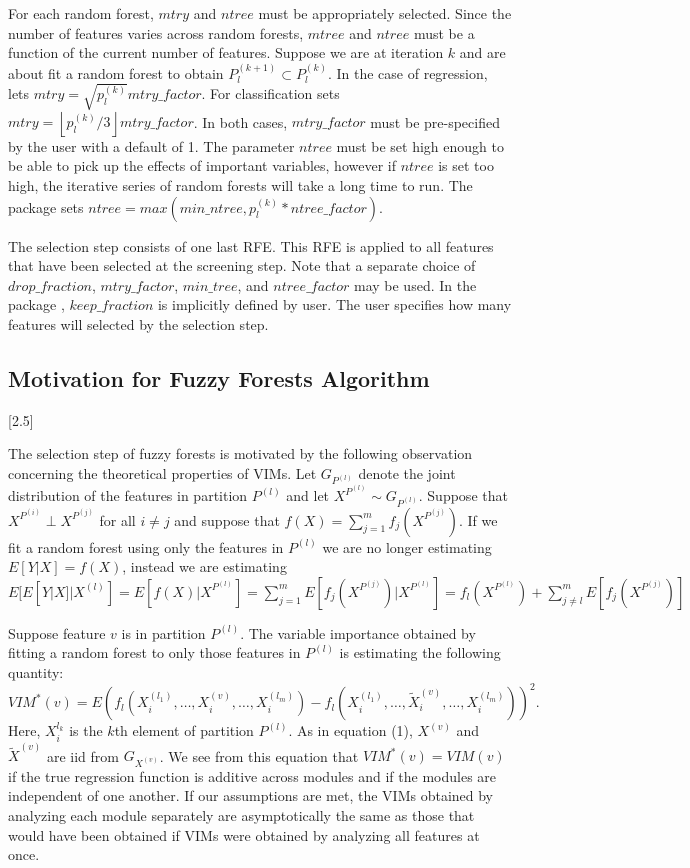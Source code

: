 \documentclass[article,shortnames]{jss}
\begin{document}
For each random forest, $mtry$ and $ntree$ must be appropriately selected.  Since the number of features varies across random forests, $mtree$
and $ntree$ must be a function of the current number of features.   Suppose we are at iteration $k$ and are about fit a random forest to obtain
$P_{l}^{(k+1)}\subset P_{l}^{(k)}$.  In the case of regression,  lets $mtry=\sqrt{p^{(k)}_{l}}mtry\_factor$.  For classification 
 sets $mtry=\left\lfloor p^{(k)}_{l}/3 \right\rfloor mtry\_factor$.  In both cases, $mtry\_factor$ must be pre-specified by the user
with a default of 1.  The parameter $ntree$ must be set high enough to be able to pick up the effects
of important variables, however if $ntree$ is set too high, the iterative series of random forests will take a long time to run.  The package  sets $ntree=max(min\_ntree,p^{(k)}_{l}*ntree\_factor)$.
   
The selection step consists of one last RFE. This RFE is applied to all features that have
been selected at the screening step.  Note that a separate choice of $drop\_fraction$, $mtry\_factor$, $min\_tree$,
and $ntree\_factor$ may be used.  In the package , $keep\_fraction$ is implicitly defined by user.  The user specifies 
how many features will selected by the selection step.  

\subsection{Motivation for Fuzzy Forests Algorithm}[2.5]

The selection step of fuzzy forests is motivated by the following observation concerning the theoretical properties of VIMs. 
Let $G_{P^{(l)}}$ denote the joint distribution of the features in partition $P^{(l)}$ and let $X^{P^{(l)}} \sim G_{P^{(l)}}$.
Suppose that $X^{P^{(i)}} \perp X^{P^{(j)}}$ for all $i\neq j$ and suppose that $f(X)=\sum_{j=1}^{m}f_{j}(X^{P^{(j)}})$.  If we fit
a random forest using only the features in $P^{(l)}$ we are no longer estimating $E[Y|X]=f(X)$, instead we are estimating
 $E[E[Y|X]|X^{(l)}]=E[f(X)|X^{P^{(l)}}]=\sum_{j=1}^{m}E[f_{j}(X^{P^{(j)}})|X^{P^{(l)}}]=f_{l}(X^{P^{(l)}}) + \sum_{j\neq l}^{m}E[f_{j}(X^{P^{(j)}})]$

Suppose feature $v$ is in partition $P^{(l)}$.  The variable importance obtained by fitting a random forest to only those features in  $P^{(l)}$
 is estimating the following quantity: 
 \begin{equation}
 VIM^{*}(v)=E(f_{l}(X^{(l_{1})}_{i},\ldots,X^{(v)}_{i},\ldots,X^{(l_{m})}_{i}) - f_{l}(X^{(l_{1})}_{i},\ldots,\tilde{X}^{(v)}_{i},\ldots,X^{(l_{m})}_{i}))^{2}.
 \end{equation}
 Here, $X_{i}^{l_{k}}$ is the $k$th element of partition $P^{(l)}$. As in equation (1), $X^{(v)}$ and $\tilde{X}^{(v)}$ are iid from $G_{X^{(v)}}$.
 We see from this equation that $VIM^{*}(v)=VIM(v)$ if the true regression function is additive across modules and if the modules are independent
 of one another.  If our assumptions are met, the VIMs obtained by analyzing each module separately are asymptotically the same as those that 
would have been obtained if VIMs were obtained by analyzing all features at once.       
\end{document}
